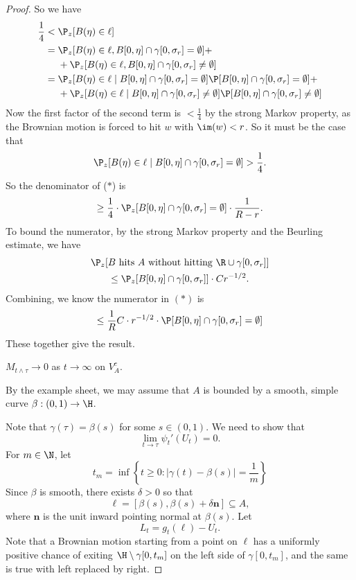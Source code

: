 \documentclass[a4paper]{article}
\begin{document}
\begin{proof}
  So we have
  \begin{align*}
    \frac{1}{4} &< \P_z[B(\eta) \in \ell]\\
    &= \P_z[B(\eta) \in \ell, B[0, \eta] \cap \gamma[0, \sigma_r] = \emptyset] +\\
    &\hphantom{{}={}}+\P_z[B(\eta) \in \ell, B[0, \eta] \cap \gamma[0, \sigma_r] \not= \emptyset]\\
    &= \P_z[B(\eta) \in \ell \mid B[0, \eta] \cap \gamma[0, \sigma_r] = \emptyset] \P[B[0, \eta] \cap \gamma[0, \sigma_r] = \emptyset] +\\
    &\hphantom{{}={}}+\P_z[B(\eta) \in \ell \mid  B[0, \eta] \cap \gamma[0, \sigma_r] \not= \emptyset]\P[ B[0, \eta] \cap \gamma[0, \sigma_r] \not= \emptyset]
  \end{align*}
  Now the first factor of the second term is $< \frac{1}{4}$ by the strong Markov property, as the Brownian motion is forced to hit $w$ with $\im(w) < r$. So it must be the case that
  \[
    \P_z[B(\eta) \in \ell \mid B[0, \eta] \cap \gamma[0, \sigma_r] = \emptyset] > \frac{1}{4}.
  \]
  So the denominator of ($*$) is
  \[
    \geq \frac{1}{4}\cdot \P_z[B[0, \eta] \cap \gamma[0, \sigma_r] = \emptyset] \cdot \frac{1}{R -r }.
  \]
  To bound the numerator, by the strong Markov property and the Beurling estimate, we have
  \begin{multline*}
    \P_z[B\text{ hits $A$ without hitting }\R \cup \gamma[0, \sigma_r]]\\
    \leq \P_z[B[0, \eta] \cap \gamma[0, \sigma_r]] \cdot C r^{-1/2}.
  \end{multline*}
  Combining, we know the numerator in $(*)$ is
  \[
    \leq \frac{1}{R} C \cdot r^{-1/2} \cdot \P[B[0, \eta] \cap \gamma[0, \sigma_r] = \emptyset]
  \]
  These together give the result.

  \begin{claim}
    $M_{t \wedge \tau} \to 0$ as $t \to \infty$ on $V_A^c$.
  \end{claim}
  By the example sheet, we may assume that $A$ is bounded by a smooth, simple curve $\beta: (0, 1) \to \H$.

  Note that $\gamma(\tau) = \beta(s)$ for some $s \in (0, 1)$. We need to show that
  \[
    \lim_{t \to \tau} \psi_t'(U_t) = 0.
  \]
  For $m \in \N$, let
  \[
    t_m = \inf \left\{t \geq 0 : |\gamma(t) - \beta(s)| = \frac{1}{m}\right\}
  \]
  Since $\beta$ is smooth, there exists $\delta > 0$ so that
  \[
    \ell = [\beta (s), \beta(s) + \delta \mathbf{n}] \subseteq A,
  \]
  where $\mathbf{n}$ is the unit inward pointing normal at $\beta(s)$. Let
  \[
    L_t = g_t(\ell) - U_t.
  \]
  Note that a Brownian motion starting from a point on $\ell$ has a uniformly positive chance of exiting $\H \setminus \gamma[0 ,t_m]$ on the left side of $\gamma[0, t_m]$, and the same is true with left replaced by right.


\end{proof}
\end{document}
